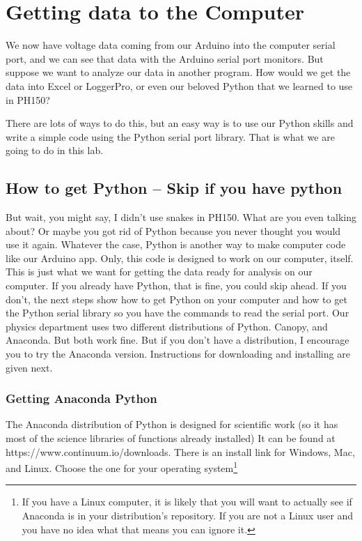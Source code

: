 \chapter{Getting data to the Computer}
We now have voltage data coming from our Arduino into the computer serial port, and we can see that data with the Arduino serial port monitors. But suppose we want to analyze our data in another program. How would we get the data into Excel or LoggerPro, or even our beloved Python that we learned to use in PH150?

There are lots of ways to do this, but an easy way is to use our Python skills and write a simple code using the Python serial port library. That is what we are going to do in this lab.

\section{How to get Python -- Skip if you have python}

But wait, you might say, I didn't use snakes in PH150. What are you even talking about? Or maybe you got rid of Python because you never thought you would use it again. Whatever the case, Python is another way to make computer code like our Arduino app. Only, this code is designed to work on our computer, itself. This is just what we want for getting the data ready for analysis on our computer. If you already have Python, that is fine, you could skip ahead. If you don't, the next steps show how to get Python on your computer and how to get the Python serial library so you have the commands to read the serial port. Our physics department uses two different distributions of Python. Canopy, and Anaconda. But both work fine. But if you don't have a distribution, I encourage you to try the Anaconda version. Instructions for downloading and installing are given next. 

\subsection{Getting Anaconda Python}

The Anaconda distribution of Python is designed for scientific work (so it has most of the science libraries of functions already installed) It can be found at https://www.continuum.io/downloads. There is an install link for Windows, Mac, and Linux. Choose the one for your operating system\footnote{If you have a Linux computer, it is likely that you will want to actually see if Anaconda is in your distribution's repository. If you are not a Linux user and you have no idea what that means you can ignore it.}

